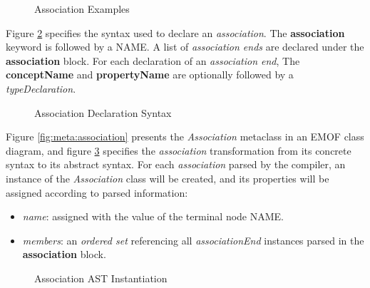 \begin{figure}
\verbatimfont{\small}

\caption{Association Examples}
\label{fig:ex:associations}
\end{figure}

\begin{concrete-syntax}
Figure \ref{fig:stx:association} specifies the syntax used
to declare an \emph{association}.
The \textbf{association} keyword is followed by a NAME.
A list of \emph{association ends} are declared under the \textbf{association} block.
For each declaration of an \emph{association end},
The \textbf{conceptName} and \textbf{propertyName} are optionally followed by a \emph{typeDeclaration}.
\end{concrete-syntax}

\begin{figure}
\verbatimfont{\small}

\caption{Association Declaration Syntax}
\label{fig:stx:association}
\end{figure}

\begin{abstract-syntax}
Figure \ref{fig:meta:association} presents the \emph{Association} metaclass
in an EMOF \cite{mof} class diagram,
and figure \ref{fig:ast:association} specifies
the \emph{association} transformation
from its concrete syntax to its abstract syntax.
For each \emph{association} parsed by the compiler,
an instance of the \emph{Association} class will be created,
and its properties will be assigned
according to parsed information:

\begin{itemize}

\item \emph{name}:
assigned with the value of the terminal node NAME.

\item \emph{members}:
an \emph{ordered set} referencing all \emph{associationEnd}
instances parsed in the \textbf{association} block.

\end{itemize}
\end{abstract-syntax}

\begin{figure}
\verbatimfont{\small}

\caption{Association AST Instantiation}
\label{fig:ast:association}
\end{figure}

\begin{constraints}

\end{constraints}